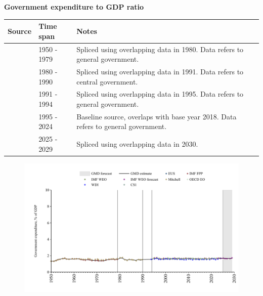 \documentclass[12pt,a4paper,landscape]{article}
\begin{document}
\begin{adjustbox}{max totalsize={\paperwidth}{\paperheight},center}
\begin{minipage}[t][\textheight][t]{\textwidth}
\vspace*{0.5cm}
{}
\begin{center}
{\Large\bfseries Government expenditure to GDP ratio}
\end{center}
\vspace{0.5cm}
\begin{table}[H]
\centering
\small
\begin{tabular}{|l|l|l|}
\hline
\textbf{Source} & \textbf{Time span} & \textbf{Notes} \\
\hline
\rowcolor{white}\cite{IMF_FPP}& 1950 - 1979 &Spliced using overlapping data in 1980. Data refers to general government.\\
\rowcolor{lightgray}\cite{Mitchell}& 1980 - 1990 &Spliced using overlapping data in 1991. Data refers to central government.\\
\rowcolor{white}\cite{WDI}& 1991 - 1994 &Spliced using overlapping data in 1995. Data refers to general government.\\
\rowcolor{lightgray}\cite{EUS}& 1995 - 2024 &Baseline source, overlaps with base year 2018. Data refers to general government.\\
\rowcolor{white}\cite{IMF_WEO_forecast}& 2025 - 2029 &Spliced using overlapping data in 2030. \\
\hline
\end{tabular}
\end{table}
\begin{figure}[H]
\centering
\includegraphics[width=\textwidth,height=0.6\textheight,keepaspectratio]{graphs/POL_govexp_GDP.pdf}
\end{figure}
\end{minipage}
\end{adjustbox}
\end{document}
